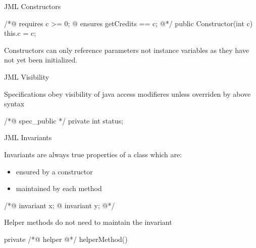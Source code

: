 \begin{topic}{JML Constructors}

\begin{java}
/*@ requires c >= 0;
  @ ensures getCredits == c;
  @*/
public Constructor(int c) {
    this.c = c;
}
\end{java}

\begin{subtopic}{2}
Constructors can only reference parameters not instance variables as they have not yet been initialized.
\end{subtopic}

\end{topic}

\begin{topic}{JML Visibility}

Specifications obey visibility of java access modifieres unless overriden by above syntax

\begin{java}
/*@ spec_public */ private int status;
\end{java}

\end{topic}

\begin{topic}{JML Invariants}

Invariants are always true properties of a class which are:
\begin{itemize}
 \item ensured by a constructor
 \item maintained by each method
\end{itemize}

\begin{java}
/*@ invariant x;
  @ invariant y;
  @*/
\end{java}

\begin{subtopic}{2}
Helper methods do not need to maintain the invariant
\begin{java}
private /*@ helper @*/ helperMethod() {}
\end{java}
\end{subtopic}

\end{topic}